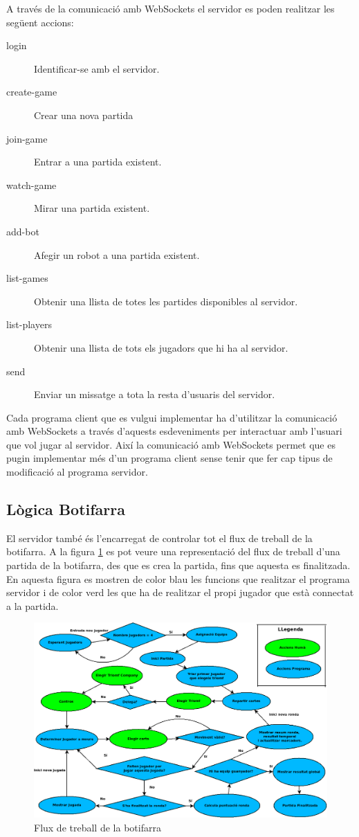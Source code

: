 A través de la comunicació amb WebSockets el servidor es poden realitzar les següent accions: 

\begin{description}
\item[login] {Identificar-se amb el servidor.}
\item[create-game] {Crear una nova partida}
\item[join-game] {Entrar a una partida existent.}
\item[watch-game] {Mirar una partida existent.}
\item[add-bot] {Afegir un robot a una partida existent.}
\item[list-games] {Obtenir una llista de totes les partides disponibles al servidor.}
\item[list-players] {Obtenir una llista de tots els jugadors que hi ha al servidor.}
\item[send] {Enviar un missatge a tota la resta d'usuaris del servidor. }
\end{description}

Cada programa client que es vulgui implementar ha d'utilitzar la comunicació amb WebSockets a través d'aquests esdeveniments per interactuar amb l'usuari que vol jugar al servidor. Així la comunicació amb WebSockets permet que es pugin implementar més d'un programa client sense tenir que fer cap tipus de modificació al programa servidor. 

\subsection{Lògica Botifarra}

El servidor també és l'encarregat de controlar tot el flux de treball de la botifarra. A la figura \ref{fig:buti-workflow} es pot veure una representació del flux de treball d'una partida de la botifarra, des que es crea la partida, fins que aquesta es finalitzada. En aquesta figura es mostren de color blau les funcions que realitzar el programa servidor i de color verd les que ha de realitzar el propi jugador que està connectat a la partida. 

\begin{figure}[htbp]
\hspace*{-1in}
\centering\includegraphics[width=18cm]{img/butifarra_workflow.png}
\caption{Flux de treball de la botifarra}
\label{fig:buti-workflow}
\end{figure} 

